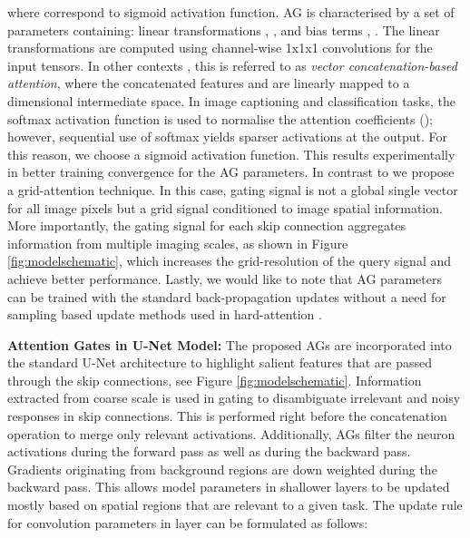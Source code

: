\documentclass{article}
\begin{document}
where  correspond to sigmoid activation function. AG is characterised by a set of parameters  containing: linear transformations , ,  and bias terms  , . The linear transformations are computed using channel-wise 1x1x1 convolutions for the input tensors. In other contexts \cite{wang2017non}, this is referred to as \emph{vector concatenation-based attention}, where the concatenated features  and  are linearly mapped to a  dimensional intermediate space. In image captioning \cite{anderson2017bottom} and classification \cite{jetley2018learn} tasks, the softmax activation function is used to normalise the attention coefficients (); however, sequential use of softmax yields sparser activations at the output. For this reason, we choose a sigmoid activation function. This results experimentally in better training convergence for the AG parameters. In contrast to \cite{jetley2018learn} we propose a grid-attention technique. In this case, gating signal is not a global single vector for all image pixels but a grid signal conditioned to image spatial information. More importantly, the gating signal for each skip connection aggregates information from multiple imaging scales, as shown in Figure \ref{fig:modelschematic}, which increases the grid-resolution of the query signal and achieve better performance. Lastly, we would like to note that AG parameters can be trained with the standard back-propagation updates without a need for sampling based update methods used in hard-attention \cite{mnih2014recurrent}. 

\textbf{Attention Gates in U-Net Model:} The proposed AGs are incorporated into the standard U-Net architecture to highlight salient features that are passed through the skip connections, see Figure \ref{fig:modelschematic}. Information extracted from coarse scale is used in gating to disambiguate irrelevant and noisy responses in skip connections. This is performed right before the concatenation operation to merge only relevant activations. Additionally, AGs filter the neuron activations during the forward pass as well as during the backward pass. Gradients originating from background regions are down weighted during the backward pass. This allows model parameters in shallower layers to be updated mostly based on spatial regions that are relevant to a given task. The update rule for convolution parameters in layer  can be formulated as follows:   
\end{document}
